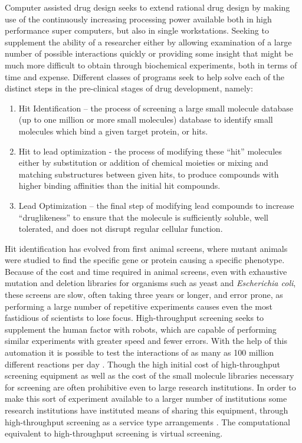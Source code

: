 Computer assisted drug design seeks to extend rational drug design by making use of the continuously increasing processing power available both in high performance super computers, but also in single workstations.
Seeking to supplement the ability of a researcher either by allowing examination of a large number of possible interactions quickly or providing some insight that might be much more difficult to obtain through biochemical experiments, both in terms of time and expense.
Different classes of programs seek to help solve each of the distinct steps in the pre-clinical stages of drug development, namely:
\begin{enumerate}
\item Hit Identification – the process of screening a large small molecule database (up to one million or more small molecules) database to identify small molecules which bind a given target protein, or hits.
\item Hit to lead optimization - the process of modifying these ``hit'' molecules either by substitution or addition of chemical moieties or mixing and matching substructures between given hits, to produce compounds with higher binding affinities than the initial hit compounds.
\item Lead Optimization – the final step of modifying lead compounds to increase ``druglikeness'' to ensure that the molecule is sufficiently soluble, well tolerated, and does not disrupt regular cellular function.
\end{enumerate}

Hit identification has evolved from first animal screens, where mutant animals were studied to find the specific gene or protein causing a specific phenotype.
Because of the cost and time required in animal screens, even with exhaustive mutation and deletion libraries for organisms such as yeast and {\it Escherichia coli}, these screens are slow, often taking three years or longer, and error prone, as performing a large number of repetitive experiments causes even the most fastidious of scientists to lose focus.
High-throughput screening seeks to supplement the human factor with robots, which are capable of performing similar experiments with greater speed and fewer errors.
With the help of this automation it is possible to test the interactions of as many as 100 million different reactions per day \cite{agresti2010ultrahigh}.
Though the high initial cost of high-throughput screening equipment as well as the cost of the small molecule libraries necessary for screening are often prohibitive even to large research institutions.
In order to make this sort of experiment available to a larger number of institutions some research institutions have instituted means of sharing this equipment, through high-throughput screening as a service type arrangements \cite{htsrc,mssr}.
The computational equivalent to high-throughput screening is virtual screening.

